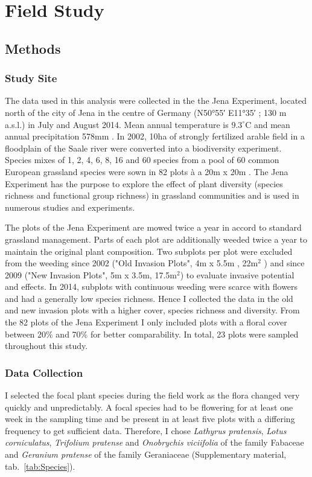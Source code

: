 \label{ch:methods}

\section{Field Study} 

\subsection{Methods}

\subsubsection*{Study Site}
The data used in this analysis were collected in the the Jena Experiment, located north of the city of Jena in the centre of Germany (N\ang{50;55;} E\ang{11;35;} ; 130 m a.s.l.) in July and August 2014. Mean annual temperature is $9.3 ^\circ\text{C}$ and mean annual precipitation 578mm \citep{kluge2000klima}. In 2002, 10ha of strongly fertilized arable field in a floodplain of the Saale river were converted into a biodiversity experiment. Species mixes of 1, 2, 4, 6, 8, 16 and 60 species from a pool of 60 common European grassland species were sown in 82 plots 	\`{a} a 20m x 20m \citep{roscher2004role}.  The Jena Experiment has the purpose to explore the effect of plant diversity (species richness and functional group richness) in grassland communities and is used in numerous studies and experiments.

The plots of the Jena Experiment are mowed twice a year in accord to standard grassland management. Parts of each plot are additionally weeded twice a year to maintain the original plant composition. Two subplots per plot were excluded from the weeding since 2002 ("Old Invasion Plots", 4m x 5.5m , 22m$^{2}$ ) and since 2009 ("New Invasion Plots", 5m x 3.5m, 17.5m$^{2}$) to evaluate invasive potential and effects. In 2014, subplots with continuous weeding were scarce with flowers and had a generally low species richness. Hence I collected the data in the old and new invasion plots with a higher cover, species richness and diversity. From the 82 plots of the Jena Experiment I only included plots with a floral cover between 20\% and 70\% for better comparability. In total, 23 plots were sampled throughout this study. 

\subsubsection*{Data Collection}
I selected the focal plant species during the field work as the flora changed very quickly and unpredictably. A focal species had to be flowering for at least one week in the sampling time and be present in at least five plots with a differing frequency to get sufficient data. Therefore, I chose \textit{Lathyrus pratensis}, \textit{Lotus corniculatus}, \textit{Trifolium pratense} and \textit{Onobrychis viciifolia} of the family Fabaceae and \textit{Geranium pratense} of the family Geraniaceae (Supplementary material, tab.~\ref{tab:Species}).

